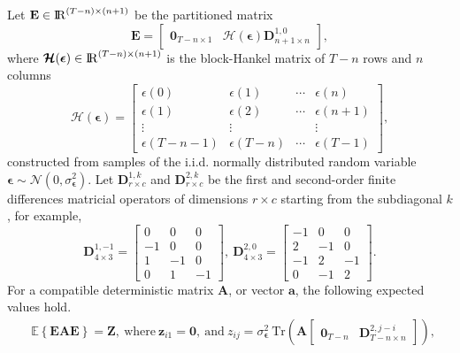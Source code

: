 \begin{lem}{\small}\label{lem:lemma1}
Let $\mathbf{E} \in {\rm I\!R}^{\left(T-n\right) \times \left(n+1\right)}$ be the partitioned matrix 
\[ \mathbf{E} = \begin{bmatrix} \mathbf{0}_{T-n \times 1} & \bm{\mathcal{H}}(\bm{\epsilon}) \mathbf{D}_{n+1 \times n}^{1,0} \end{bmatrix}, \]
 where $\bm{\mathcal{H}}(\bm{\epsilon}) \in {\rm I\!R}^{\left(T-n\right) \times \left(n+1\right)}$ is the block-Hankel matrix of $T-n$ rows and $n$ columns
\[ \bm{\mathcal{H}}(\bm{\epsilon}) = \begin{bmatrix} \epsilon(0) & \epsilon(1) & \cdots & \epsilon(n) \\ \epsilon(1) & \epsilon(2) & \cdots & \epsilon(n+1) \\ \vdots & \vdots & & \vdots \\ \epsilon(T-n-1) & \epsilon(T-n) & \cdots & \epsilon(T-1) \end{bmatrix} , \]
constructed from samples of the i.i.d. normally distributed random variable $\bm{\epsilon} \sim \mathcal{N}(0, \sigma_{\bm{\epsilon}}^2)$.
Let $\mathbf{D}_{r \times c}^{1,k}$ and $\mathbf{D}_{r \times c}^{2,k}$ be the first and second-order finite differences matricial operators of dimensions $r \times c$ starting from the subdiagonal $k$, for example, 
\[ \mathbf{D}_{4 \times 3}^{1,-1} = \begin{bmatrix} 0 & 0 & 0 \\ -1 & 0 & 0 \\ 1 & -1 & 0 \\ 0 & 1 & -1 \end{bmatrix}, \ \mathbf{D}_{4 \times 3}^{2,0} = \begin{bmatrix}-1 & 0 & 0 \\ 2 & -1 & 0 \\ - 1 & 2 & -1 \\ 0 & -1 & 2 \end{bmatrix} . \]
For a compatible deterministic matrix $\mathbf{A}$, or vector $\mathbf{a}$, the following expected values hold.
\begin{equation*} \begin{aligned} 
& \mathbb{E} \left\{ \mathbf{E} \mathbf{A} \mathbf{E} \right\} = \mathbf{Z}, \
\text{where} \ \mathbf{z}_{i1} = \mathbf{0}, \ \text{and} \ 
z_{ij} = \sigma_{\bm{\epsilon}}^2 \ \mathrm{Tr} \left( \mathbf{A} \begin{bmatrix} \mathbf{0}_{T-n} & \mathbf{D}_{T-n \times n}^{2, j-i} \end{bmatrix} \right), \

\end{aligned}
\end{equation*}
\end{lem}
